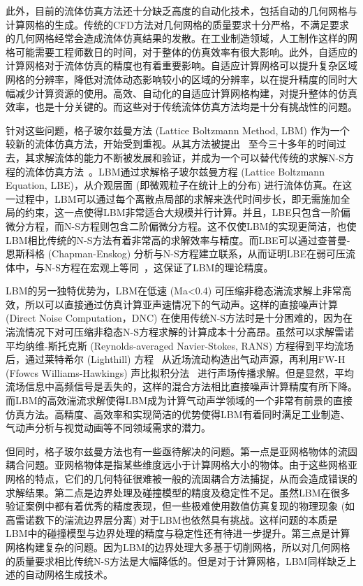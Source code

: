 此外，目前的流体仿真方法还十分缺乏高度的自动化技术，包括自动的几何网格与计算网格的生成。传统的CFD方法对几何网格的质量要求十分严格，不满足要求的几何网格经常会造成流体仿真结果的发散。在工业制造领域，人工制作这样的网格可能需要工程师数日的时间，对于整体的仿真效率有很大影响。此外，自适应的计算网格对于流体仿真的精度也有着重要影响。自适应计算网格可以提升复杂区域网格的分辨率，降低对流体动态影响较小的区域的分辨率，以在提升精度的同时大幅减少计算资源的使用。高效、自动化的自适应计算网格构建，对提升整体的仿真效率，也是十分关键的。而这些对于传统流体仿真方法均是十分有挑战性的问题。

针对这些问题，格子玻尔兹曼方法 (Lattice Boltzmann Method, LBM) 作为一个较新的流体仿真方法，开始受到重视。从其方法被提出~\cite{PhysRevLett.61.2332} 至今三十多年的时间过去，其求解流体的能力不断被发展和验证，并成为一个可以替代传统的求解N-S方程的流体仿真方法~\cite{ARUMUGAPERUMAL2015955}。LBM通过求解格子玻尔兹曼方程 (Lattice Boltzmann Equation, LBE)，从介观层面 (即微观粒子在统计上的分布) 进行流体仿真。在这一过程中，LBM可以通过每个离散点局部的求解来迭代时间步长，即无需施加全局的约束，这一点使得LBM非常适合大规模并行计算。并且，LBE只包含一阶偏微分方程，而N-S方程则包含二阶偏微分方程。这不仅使LBM的实现更简洁，也使LBM相比传统的N-S方法有着非常高的求解效率与精度。而LBE可以通过查普曼-恩斯科格 (Chapman-Enskog) 分析与N-S方程建立联系，从而证明LBE在弱可压流体中，与N-S方程在宏观上等同~\cite{Y.H.Qian_1993}，这保证了LBM的理论精度。

LBM的另一独特优势为，LBM在低速 (Ma<0.4) 可压缩非稳态湍流求解上非常高效，所以可以直接通过仿真计算亚声速情况下的气动声。这样的直接噪声计算 (Direct Noise Computation，DNC) 在使用传统N-S方法时是十分困难的，因为在湍流情况下对可压缩非稳态N-S方程求解的计算成本十分高昂。虽然可以求解雷诺平均纳维-斯托克斯 (Reynolds-averaged Navier-Stokes, RANS) 方程得到平均流场后，通过莱特希尔 (Lighthill) 方程~\cite{doi:10.1098/rspa.1952.0060} 从近场流动构造出气动声源，再利用FW-H (Ffowcs Williams-Hawkings) 声比拟积分法~\cite{doi:10.1098/rsta.1969.0031} 进行声场传播求解。但是显然，平均流场信息中高频信号是丢失的，这样的混合方法相比直接噪声计算精度有所下降。而LBM的高效湍流求解使得LBM成为计算气动声学领域的一个非常有前景的直接仿真方法。高精度、高效率和实现简洁的优势使得LBM有着同时满足工业制造、气动声分析与视觉动画等不同领域需求的潜力。

但同时，格子玻尔兹曼方法也有一些亟待解决的问题。第一点是亚网格物体的流固耦合问题。亚网格物体是指某些维度远小于计算网格大小的物体。由于这些网格亚网格的特点，它们的几何特征很难被一般的流固耦合方法捕捉，从而会造成错误的求解结果。第二点是边界处理及碰撞模型的精度及稳定性不足。虽然LBM在很多验证案例中都有着优秀的精度表现，但一些极难使用数值仿真复现的物理现象 (如高雷诺数下的湍流边界层分离) 对于LBM也依然具有挑战。这样问题的本质是LBM中的碰撞模型与边界处理的精度与稳定性还有待进一步提升。第三点是计算网格构建复杂的问题。因为LBM的边界处理大多基于切削网格，所以对几何网格的质量要求相比传统N-S方法是大幅降低的。但是对于计算网格，LBM同样缺乏上述的自动网格生成技术。

